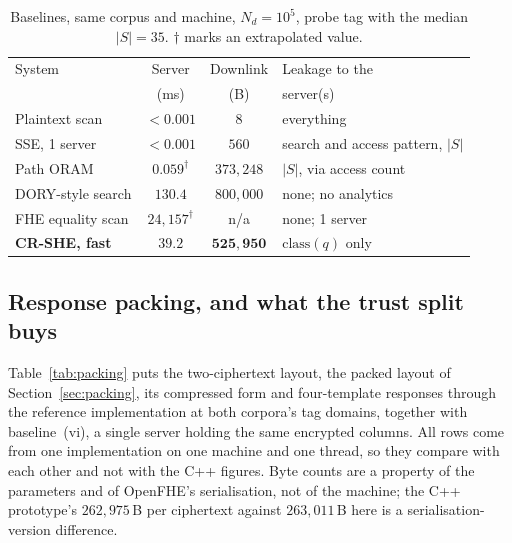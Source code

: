 \documentclass[a4paper,fleqn]{cas-sc}
\begin{document}
\begin{table}[pos=htbp]
\caption{Baselines, same corpus and machine, $N_d=10^5$, probe tag with the
median $|S|=35$. $\dagger$ marks an extrapolated value.}
\label{tab:baselines}
\centering
\footnotesize
\setlength{\tabcolsep}{3pt}
\renewcommand{\arraystretch}{1.2}
\begin{tabular}{@{}lcc>{\raggedright\arraybackslash}p{2.1cm}@{}}
\toprule
System & Server & Downlink & Leakage to the \\
       & (ms)   & (B)      & server(s) \\
\midrule
Plaintext scan        & $<0.001$ & $8$              & everything \\
SSE, 1 server         & $<0.001$ & $560$            & search and access
pattern, $|S|$ \\
Path ORAM             & $0.059^{\dagger}$ & $373{,}248$ & $|S|$, via access
count \\
DORY-style search     & $130.4$  & $800{,}000$      & none; no analytics \\
FHE equality scan     & $24{,}157^{\dagger}$ & n/a & none; 1 server \\
\midrule
\textbf{CR-SHE, fast} & $\mathbf{39.2}$ & $\mathbf{525{,}950}$ &
$\mathrm{class}(q)$ only \\
\bottomrule
\end{tabular}
\end{table}

\subsection{Response packing, and what the trust split buys}
\label{sec:packresult}
Table~\ref{tab:packing} puts the two-ciphertext layout, the packed layout of
Section~\ref{sec:packing}, its compressed form and four-template responses
through the reference implementation at both corpora's tag domains, together
with baseline~(vi), a single server holding the same encrypted columns. All
rows come from one implementation on one machine and one thread, so they
compare with each other and not with the C++ figures. Byte counts are a
property of the parameters and of OpenFHE's serialisation, not of the
machine; the C++ prototype's $262{,}975$\,B per ciphertext against
$263{,}011$\,B here is a serialisation-version difference.
\end{document}
